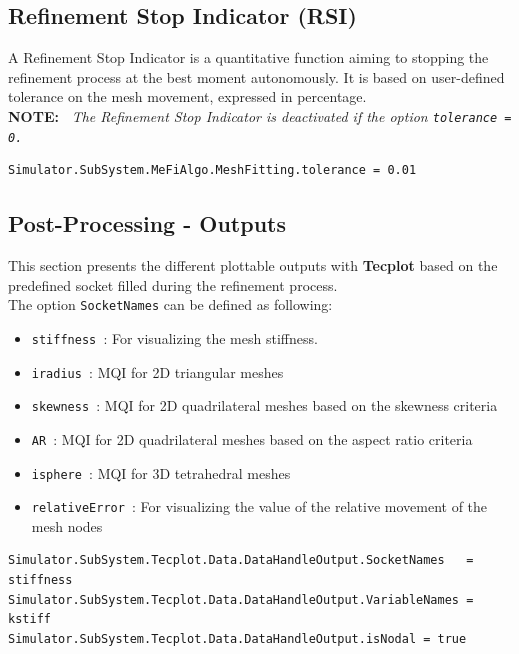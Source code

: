 \documentclass[11pt]{article}
\begin{document}
\subsection{Refinement Stop Indicator (RSI)}
A Refinement Stop Indicator is a quantitative function aiming to stopping the refinement process at the best moment autonomously. It is based on user-defined tolerance on the mesh movement, expressed in percentage.\\
{\bf NOTE:~} {\it The  Refinement Stop Indicator is deactivated if the option {\tt tolerance = 0.}}
\begin{lstlisting}[breaklines]
Simulator.SubSystem.MeFiAlgo.MeshFitting.tolerance = 0.01
\end{lstlisting}

\subsection{Post-Processing - Outputs}
This section presents the different plottable outputs with \textbf{Tecplot} based on the predefined socket filled during the refinement process.\\
The option {\tt SocketNames} can be defined as following:
\begin{itemize}
\item {\tt stiffness }: For visualizing the mesh stiffness.
\item {\tt iradius   }: MQI for 2D triangular meshes
\item {\tt skewness  }: MQI for 2D quadrilateral meshes based on the skewness criteria 
\item {\tt AR        }: MQI for 2D quadrilateral meshes based on the aspect ratio criteria
\item {\tt isphere  }:  MQI for 3D tetrahedral meshes
\item {\tt relativeError }: For visualizing the value of the relative movement of the mesh nodes 
\end{itemize}

\begin{lstlisting}[breaklines]
Simulator.SubSystem.Tecplot.Data.DataHandleOutput.SocketNames   = stiffness
Simulator.SubSystem.Tecplot.Data.DataHandleOutput.VariableNames = kstiff
Simulator.SubSystem.Tecplot.Data.DataHandleOutput.isNodal = true
\end{lstlisting}
\end{document}
